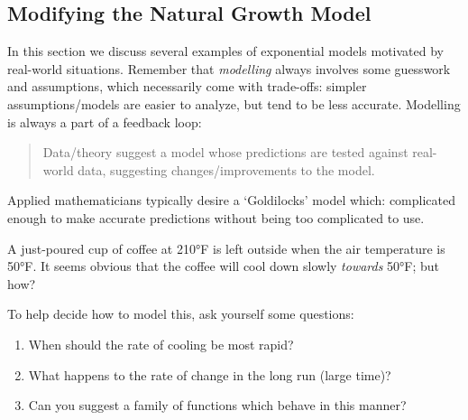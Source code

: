 \clearpage


\subsection{Modifying the Natural Growth Model}

In this section we discuss several examples of exponential models motivated by real-world situations. Remember that \emph{modelling} always involves some guesswork and assumptions, which necessarily come with trade-offs: simpler assumptions/models are easier to analyze, but tend to be less accurate. Modelling is always a part of a feedback loop:
\begin{quote}
Data/theory suggest a model whose predictions are tested against real-world data, suggesting changes/improvements to the model.
\end{quote}
Applied mathematicians typically desire a `Goldilocks' model which: complicated enough to make accurate predictions without being too complicated to use.


A just-poured cup of coffee at \ang{210}F is left outside when the air temperature is \ang{50}F. It seems obvious that the coffee will cool down slowly \emph{towards} \ang{50}F; but how?\smallbreak

To help decide how to model this, ask yourself some questions:

\begin{enumerate}%
  \item When should the rate of cooling be most rapid?
  \item What happens to the rate of change in the long run (large time)?
  \item Can you suggest a family of functions which behave in this manner?
\end{enumerate}


